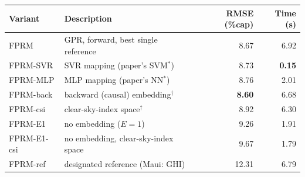 \begin{tabular}{llrr}
\toprule
Variant & Description & RMSE (\%cap) & Time (s) \\
\midrule
FPRM & GPR, forward, best single reference & 8.67 & 6.92 \\
FPRM-SVR & SVR mapping (paper's SVM$^*$) & 8.73 & \textbf{0.15} \\
FPRM-MLP & MLP mapping (paper's NN$^*$) & 8.76 & 2.01 \\
FPRM-back & backward (causal) embedding$^\dagger$ & \textbf{8.60} & 6.68 \\
FPRM-csi & clear-sky-index space$^\dagger$ & 8.92 & 6.30 \\
FPRM-E1 & no embedding ($E{=}1$) & 9.26 & 1.91 \\
FPRM-E1-csi & no embedding, clear-sky-index space & 9.67 & 1.79 \\
FPRM-ref & designated reference (Maui: GHI) & 12.31 & 6.79 \\
\bottomrule
\end{tabular}
